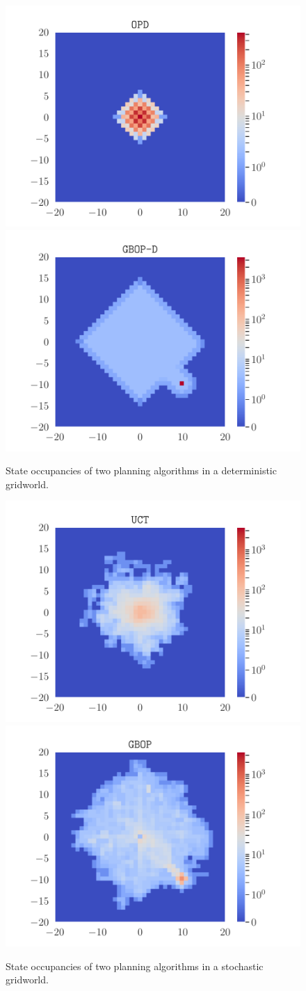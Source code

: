 \begin{figure}[ht]
	\centering
	\includegraphics[trim={1.8cm 0.7cm 1.8cm 0.7cm}, clip, width=0.4\linewidth]{img/gbop/occupations_OPD.pdf}
	\includegraphics[trim={1.8cm 0.7cm 1.8cm 0.7cm}, clip, width=0.4\linewidth]{img/gbop/occupations_GBOP-D.pdf}
	\caption{State occupancies of two planning algorithms in a deterministic gridworld.}
	\label{fig:deterministic-gridworld}
\end{figure}
\begin{figure}[ht]
	\centering
	\includegraphics[trim={1.8cm 0.7cm 1.8cm 0.7cm}, clip, width=0.4\linewidth]{img/gbop/occupations_UCT.pdf}
	\includegraphics[trim={1.8cm 0.7cm 1.8cm 0.7cm}, clip, width=0.4\linewidth]{img/gbop/occupations_GBOP.pdf}
	\caption{State occupancies of two planning algorithms in a stochastic gridworld.}
	\label{fig:stochastic-gridworld}
\end{figure}

